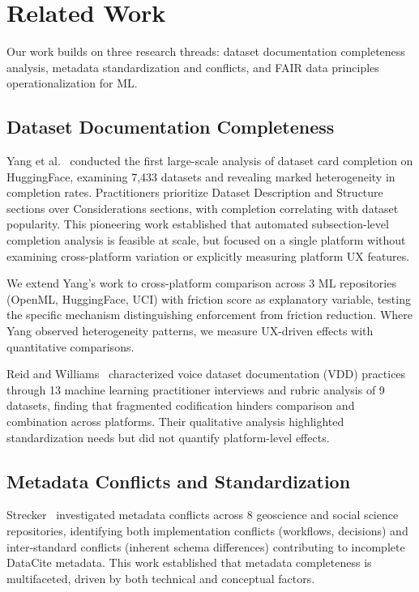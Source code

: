 \section{Related Work}
\label{sec:related}

Our work builds on three research threads: dataset documentation completeness analysis, metadata standardization and conflicts, and FAIR data principles operationalization for ML.

\subsection{Dataset Documentation Completeness}

Yang et al.~\cite{yang2024dataset} conducted the first large-scale analysis of dataset card completion on HuggingFace, examining 7,433 datasets and revealing marked heterogeneity in completion rates. Practitioners prioritize Dataset Description and Structure sections over Considerations sections, with completion correlating with dataset popularity. This pioneering work established that automated subsection-level completion analysis is feasible at scale, but focused on a single platform without examining cross-platform variation or explicitly measuring platform UX features.

We extend Yang's work to cross-platform comparison across 3 ML repositories (OpenML, HuggingFace, UCI) with friction score as explanatory variable, testing the specific mechanism distinguishing enforcement from friction reduction. Where Yang observed heterogeneity patterns, we measure UX-driven effects with quantitative comparisons.

Reid and Williams~\cite{reid2023voice} characterized voice dataset documentation (VDD) practices through 13 machine learning practitioner interviews and rubric analysis of 9 datasets, finding that fragmented codification hinders comparison and combination across platforms. Their qualitative analysis highlighted standardization needs but did not quantify platform-level effects.

\subsection{Metadata Conflicts and Standardization}

Strecker~\cite{strecker2026metadata} investigated metadata conflicts across 8 geoscience and social science repositories, identifying both implementation conflicts (workflows, decisions) and inter-standard conflicts (inherent schema differences) contributing to incomplete DataCite metadata. This work established that metadata completeness is multifaceted, driven by both technical and conceptual factors.

